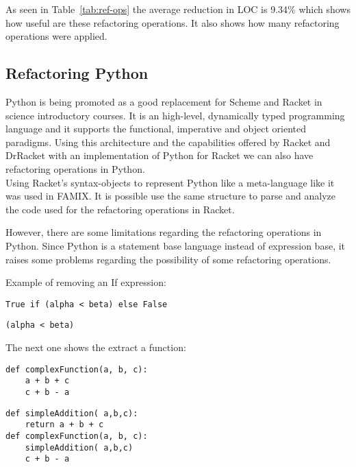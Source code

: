 As seen in Table~\ref{tab:ref-ops} the average reduction in LOC is 9.34\% which
shows how useful are these refactoring operations. It also shows how many
refactoring operations were applied.

\subsection{Refactoring Python}
Python is being promoted as a good replacement for Scheme and Racket in science introductory courses.
It is an high-level, dynamically typed programming language and it supports the functional, imperative and object
oriented paradigms.
Using this architecture and the capabilities offered by Racket and DrRacket with an implementation of Python for Racket\cite{ramos2014implementation} \cite{ramos2014reaching}
we can also have refactoring operations in Python. \\
Using Racket's syntax-objects to represent Python like a meta-language like it was used in FAMIX\cite{tichelaar2000meta}.
It is possible use the same structure to parse and analyze the code used for the refactoring operations in Racket.

However, there are some limitations regarding the refactoring operations in Python.
Since Python is a statement base language instead of expression base, it raises
some problems regarding the possibility of some refactoring operations.

Example of removing an If expression:
\lstset{style=python}
\begin{lstlisting}
True if (alpha < beta) else False
\end{lstlisting}

\begin{lstlisting}
(alpha < beta)
\end{lstlisting}

The next one shows the extract a function:
\begin{lstlisting}
def complexFunction(a, b, c):
    a + b + c
    c + b - a
\end{lstlisting}

\begin{lstlisting}
def simpleAddition( a,b,c):
    return a + b + c
def complexFunction(a, b, c):
    simpleAddition( a,b,c)
    c + b - a
\end{lstlisting}

